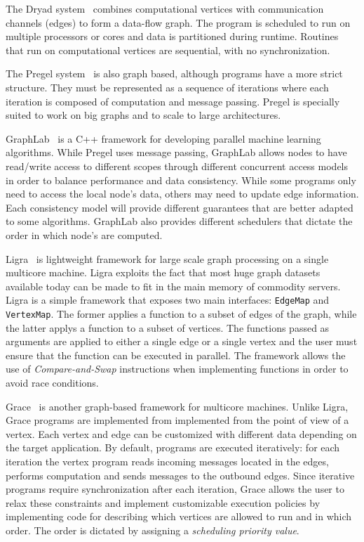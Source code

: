 The Dryad system~\cite{Isard:2007:DDD:1272996.1273005} combines computational
vertices with communication channels (edges) to form a data-flow graph. The
program is scheduled to run on multiple processors or cores and data is
partitioned during runtime. Routines that run on computational vertices are
sequential, with no synchronization.

The Pregel system~\cite{Malewicz:2010:PSL:1807167.1807184} is also graph based,
although programs have a more strict structure. They must be represented as
a sequence of iterations where each iteration is composed of computation and
message passing.  Pregel is specially suited to work on big graphs and to
scale to large architectures.

GraphLab~\cite{GraphLab2010} is a C++ framework for developing parallel machine
learning algorithms. While Pregel uses message passing, GraphLab allows nodes to
have read/write access to different scopes through different concurrent access
models in order to balance performance and data consistency. While some programs
only need to access the local node's data, others may need to update edge
information. Each consistency model will provide different guarantees that are
better adapted to some algorithms. GraphLab also provides different schedulers
that dictate the order in which node's are computed.

Ligra~\cite{Shun:2013:LLG:2517327.2442530} is lightweight framework for large scale
graph processing on a single multicore machine. Ligra exploits the fact that
most huge graph datasets available today can be made to fit in the main memory
of commodity servers. Ligra is a simple framework that exposes 
two main interfaces: \texttt{EdgeMap} and \texttt{VertexMap}. The former applies
a function to a subset of edges of the graph, while the latter applys a function
to a subset of vertices. The functions passed as arguments are applied to either
a single edge or a single vertex and the user must ensure that the function can
be executed in parallel. The framework allows the use of \emph{Compare-and-Swap}
instructions when implementing functions in order to avoid race conditions.

Grace~\cite{wang:asynchronous} is another graph-based framework for multicore
machines. Unlike Ligra, Grace programs are implemented from implemented from the
point of view of a vertex. Each vertex and edge can be customized with different
data depending on the target application. By default, programs are executed
iteratively: for each iteration the vertex program reads incoming messages
located in the edges, performs computation and sends messages to the outbound
edges. Since iterative programs require synchronization after each iteration,
Grace allows the user to relax these constraints and implement customizable
execution policies by implementing code for describing which vertices are
allowed to run and in which order. The order is dictated by assigning a
\emph{scheduling priority value}.

